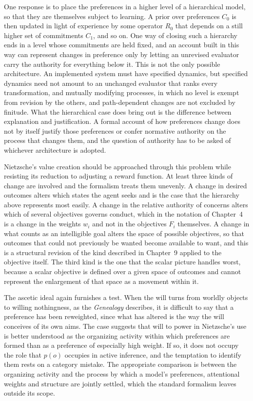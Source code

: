 One response is to place the preferences in a higher level of a hierarchical model, so that they are themselves subject to learning. A prior over preferences $C_0$ is then updated in light of experience by some operator $R_0$ that depends on a still higher set of commitments $C_1$, and so on. One way of closing such a hierarchy ends in a level whose commitments are held fixed, and an account built in this way can represent changes in preference only by letting an unrevised evaluator carry the authority for everything below it. This is not the only possible architecture. An implemented system must have specified dynamics, but specified dynamics need not amount to an unchanged evaluator that ranks every transformation, and mutually modifying processes, in which no level is exempt from revision by the others, and path-dependent changes are not excluded by finitude. What the hierarchical case does bring out is the difference between explanation and justification. A formal account of how preferences change does not by itself justify those preferences or confer normative authority on the process that changes them, and the question of authority has to be asked of whichever architecture is adopted.

Nietzsche's value creation should be approached through this problem while resisting its reduction to adjusting a reward function. At least three kinds of change are involved and the formalism treats them unevenly. A change in desired outcomes alters which states the agent seeks and is the case that the hierarchy above represents most easily. A change in the relative authority of concerns alters which of several objectives governs conduct, which in the notation of Chapter~4 is a change in the weights $w_i$ and not in the objectives $F_i$ themselves. A change in what counts as an intelligible goal alters the space of possible objectives, so that outcomes that could not previously be wanted become available to want, and this is a structural revision of the kind described in Chapter~9 applied to the objective itself. The third kind is the one that the scalar picture handles worst, because a scalar objective is defined over a given space of outcomes and cannot represent the enlargement of that space as a movement within it.

The ascetic ideal again furnishes a test. When the will turns from worldly objects to willing nothingness, as the \emph{Genealogy} describes, it is difficult to say that a preference has been reweighted, since what has altered is the way the will conceives of its own aims. The case suggests that will to power in Nietzsche's use is better understood as the organizing activity within which preferences are formed than as a preference of especially high weight. If so, it does not occupy the role that $p(o)$ occupies in active inference, and the temptation to identify them rests on a category mistake. The appropriate comparison is between the organizing activity and the process by which a model's preferences, attentional weights and structure are jointly settled, which the standard formalism leaves outside its scope.

